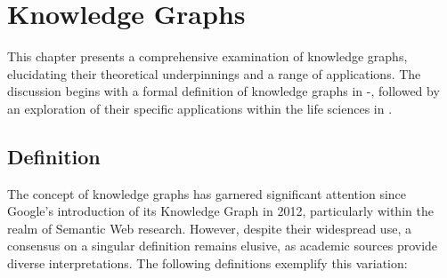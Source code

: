 \chapter{Knowledge Graphs}\label{kgs}
This chapter presents a comprehensive examination of knowledge graphs, elucidating their theoretical underpinnings and a range of applications. The discussion begins with a formal definition of knowledge graphs in -, followed by an exploration of their specific applications within the life sciences in .

\section{Definition}\label{definition}
The concept of knowledge graphs has garnered significant attention since Google's introduction of its Knowledge Graph in 2012, particularly within the realm of Semantic Web research. However, despite their widespread use, a consensus on a singular definition remains elusive, as academic sources provide diverse interpretations. The following definitions exemplify this variation:


